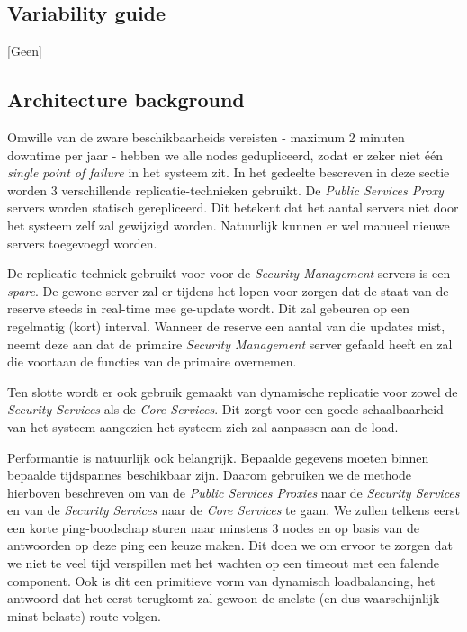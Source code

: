 \documentclass[a4paper,10pt]{article}
\begin{document}
\subsection{Variability guide}
[Geen]

\subsection{Architecture background}
\label{subsec:arch_back_dep_serv}
Omwille van de zware beschikbaarheids vereisten - maximum 2 minuten downtime per jaar - hebben we alle nodes gedupliceerd, zodat er zeker niet één \textit{single point of failure} in het systeem zit. In het gedeelte bescreven in deze sectie worden 3 verschillende replicatie-technieken gebruikt. De \textit{Public Services Proxy} servers worden statisch gerepliceerd. Dit betekent dat het aantal servers niet door het systeem zelf zal gewijzigd worden. Natuurlijk kunnen er wel manueel nieuwe servers toegevoegd worden.

De replicatie-techniek gebruikt voor voor de \textit{Security Management} servers is een \textit{spare}. De gewone server zal er tijdens het lopen voor zorgen dat de staat van de reserve steeds in real-time mee ge-update wordt. Dit zal gebeuren op een regelmatig (kort) interval. Wanneer de reserve een aantal van die updates mist, neemt deze aan dat de primaire \textit{Security Management} server gefaald heeft en zal die voortaan de functies van de primaire overnemen.

Ten slotte wordt er ook gebruik gemaakt van dynamische replicatie voor zowel de \textit{Security Services} als de \textit{Core Services}. Dit zorgt voor een goede schaalbaarheid van het systeem aangezien het systeem zich zal aanpassen aan de load.

Performantie is natuurlijk ook belangrijk. Bepaalde gegevens moeten binnen bepaalde tijdspannes beschikbaar zijn. Daarom gebruiken we de methode hierboven beschreven om van de \textit{Public Services Proxies} naar de \textit{Security Services} en van de \textit{Security Services} naar de \textit{Core Services} te gaan. We zullen telkens eerst een korte ping-boodschap sturen naar minstens 3 nodes en op basis van de antwoorden op deze ping een keuze maken. Dit doen we om ervoor te zorgen dat we niet te veel tijd verspillen met het wachten op een timeout met een falende component. Ook is dit een primitieve vorm van dynamisch loadbalancing, het antwoord dat het eerst terugkomt zal gewoon de snelste (en dus waarschijnlijk minst belaste) route volgen.
\end{document}
